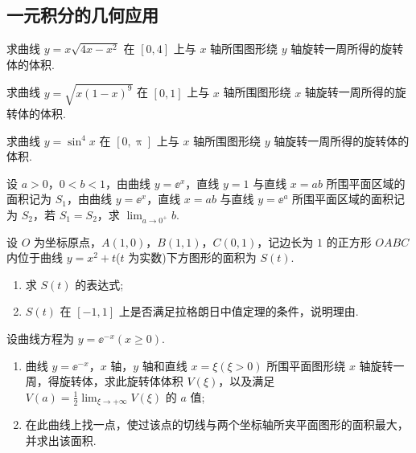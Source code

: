\subsection{一元积分的几何应用}

	\begin{ti}
		求曲线 $y = x \sqrt{4x - x^{2}}$ 在 $[0,4]$ 上与 $x$ 轴所围图形绕 $y$ 轴旋转一周所得的旋转体的体积.
	\end{ti}

	\begin{ti}
		求曲线 $y = \sqrt{ x (1 - x)^{9} }$ 在 $[0,1]$ 上与 $x$ 轴所围图形绕 $x$ 轴旋转一周所得的旋转体的体积.
	\end{ti}

	\begin{ti}
		求曲线 $y = \sin^{4}x$ 在 $[0,\uppi]$ 上与 $x$ 轴所围图形绕 $y$ 轴旋转一周所得的旋转体的体积.
	\end{ti}

	\begin{ti}
		设 $a > 0$，$0 < b < 1$，由曲线 $y = \ee^{x}$，直线 $y = 1$ 与直线 $x = ab$ 所围平面区域的面积记为 $S_{1}$，由曲线 $y = \ee^{x}$，直线 $x = ab$ 与直线 $y = \ee^{a}$ 所围平面区域的面积记为 $S_{2}$，若 $S_{1} = S_{2}$，求 $\lim_{a \to 0^{+}} b$.
	\end{ti}

	\begin{ti}
		设 $O$ 为坐标原点，$A(1,0)$，$B(1,1)$，$C(0,1)$，记边长为 $1$ 的正方形 $OABC$ 内位于曲线 $y = x^{2} + t$($t$ 为实数)下方图形的面积为 $S(t)$.
		\begin{enumerate}
			\item 求 $S(t)$ 的表达式;
			\item $S(t)$ 在 $[-1,1]$ 上是否满足拉格朗日中值定理的条件，说明理由.
		\end{enumerate}
	\end{ti}

	\begin{ti}
		设曲线方程为 $y = \ee^{-x}(x \geq 0)$.
		\begin{enumerate}
			\item 曲线 $y = \ee^{-x}$，$x$ 轴，$y$ 轴和直线 $x = \xi(\xi > 0)$ 所围平面图形绕 $x$ 轴旋转一周，得旋转体，求此旋转体体积 $V(\xi)$，以及满足 $V(a) = \frac{1}{2} \lim_{\xi \to +\infty} V(\xi)$ 的 $a$ 值;
			\item 在此曲线上找一点，使过该点的切线与两个坐标轴所夹平面图形的面积最大，并求出该面积.
		\end{enumerate}
	\end{ti}

